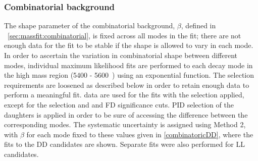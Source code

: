 \subsubsection{Combinatorial background}

The shape parameter of the combinatorial background, $\beta$, defined in \sect~\ref{sec:massfit:combinatorial}, is fixed across all \Dz modes in the \CP fit; there are not enough data for the fit to be stable if the shape is allowed to vary in each mode. In order to ascertain the variation in combinatorial shape between different \Dz modes, individual maximum likelihood fits are performed to each \Dz decay mode in the high \Bm mass region (5400 - 5600~\mevcc) using an exponential function. The selection requirements are loosened as described below in order to retain enough data to perform a meaningful fit. \runone data are used for the fits with the selection applied, except for the \Kstarm selection and \Dz and \KS FD significance cuts. PID selection of the \Dz daughters is applied in order to be sure of accessing the difference between the corresponding \Dz modes. The systematic uncertainty is assigned using Method 2, with $\beta$ for each \Dz mode fixed to these values given in \fig\ref{combinatoricDD}, where the fits to the DD candidates are shown. Separate fits were also performed for LL candidates.


